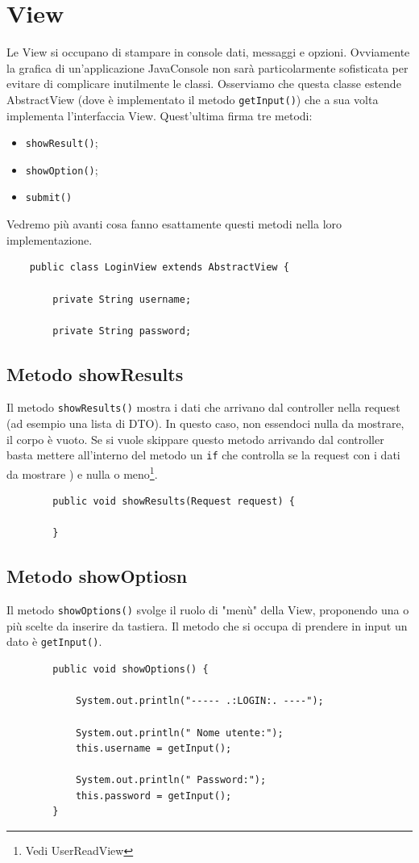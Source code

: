 \documentclass[a4paper,12 pt]{article}
\begin{document}
	\section{View}
	Le View si occupano di stampare in console dati, messaggi e opzioni. Ovviamente la grafica di un'applicazione JavaConsole non sarà particolarmente sofisticata per evitare di complicare inutilmente le classi. Osserviamo che questa classe estende AbstractView (dove è implementato il metodo \texttt{getInput()}) che a sua volta implementa l'interfaccia View. Quest'ultima firma tre metodi: 
	\begin{itemize}
		\item \texttt{showResult()};
		\item \texttt{showOption()};
		\item \texttt{submit()}
	\end{itemize}
	Vedremo più avanti cosa fanno esattamente questi metodi nella loro implementazione.
	\begin{lstlisting}
	public class LoginView extends AbstractView {
	
		private String username;
		
		private String password;
	\end{lstlisting}
	
	\subsection{Metodo showResults}
	Il metodo \texttt{showResults()} mostra i dati che arrivano dal controller nella request (ad esempio una lista di DTO). In questo caso, non essendoci nulla da mostrare, 
	il corpo è vuoto. Se si vuole skippare questo metodo arrivando dal controller basta mettere all'interno del metodo un \texttt{if} che controlla se la request con i dati da mostrare ) e nulla o meno\footnote{Vedi UserReadView}.
	\begin{lstlisting}	
		public void showResults(Request request) {
		
		}
	\end{lstlisting}
	
	\subsection{Metodo showOptiosn}
	Il metodo \texttt{showOptions()} svolge il ruolo di "menù" della View, proponendo una o più scelte da inserire da tastiera. Il metodo che si occupa di prendere in
	input un dato è \texttt{getInput()}.
	\begin{lstlisting}	
		public void showOptions() {
		
			System.out.println("----- .:LOGIN:. ----");
			
			System.out.println(" Nome utente:");
			this.username = getInput();
			
			System.out.println(" Password:");
			this.password = getInput();
		}
	\end{lstlisting}
		
\end{document}
